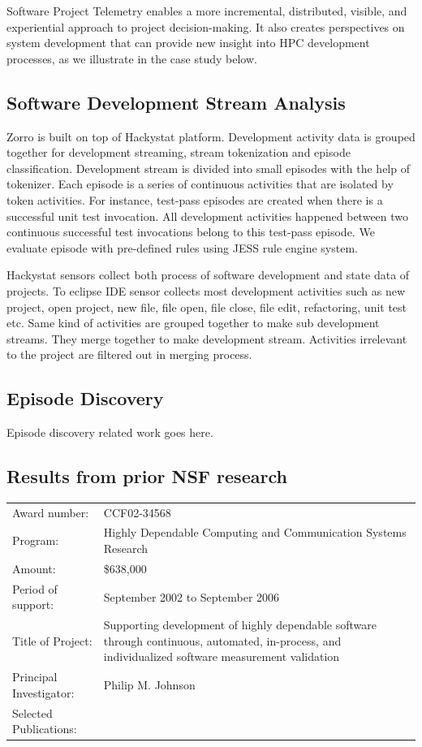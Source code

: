 Software Project Telemetry enables a more incremental, distributed,
visible, and experiential approach to project decision-making. It also
creates perspectives on system development that can provide new insight
into HPC development processes, as we illustrate in the case study below.


\subsection{Software Development Stream Analysis}

Zorro is built on top of Hackystat platform. Development activity data is
grouped together for development streaming, stream tokenization and episode
classification. Development stream is divided into small episodes with the
help of tokenizer. Each episode is a series of continuous activities that
are isolated by token activities. For instance, test-pass episodes are
created when there is a successful unit test invocation. All development
activities happened between two continuous successful test invocations
belong to this test-pass episode. We evaluate episode with pre-defined
rules using JESS \cite{Friedman-Hill:03} rule engine system.


Hackystat sensors collect both process of software development and state
data of projects. To eclipse IDE sensor collects most development
activities such as new project, open project, new file, file open, file
close, file edit, refactoring, unit test etc. Same kind of activities
are grouped together to make sub development streams. They merge together to
make development stream. Activities
irrelevant to the project are filtered out in merging process.

\subsection{Episode Discovery}

Episode discovery related work goes here. 


\subsection{Results from prior NSF research}

\small
\begin{tabular}{lp{4.5in}}

Award number: & CCF02-34568 \\
Program: & Highly Dependable Computing and Communication Systems Research\\
Amount: & \$638,000 \\
Period of support: & September 2002 to September 2006 \\
Title of Project: & Supporting development of highly dependable software through
continuous, automated, in-process, and individualized software measurement validation \\
Principal Investigator: & Philip M. Johnson \\
Selected Publications: & \cite{csdl2-04-22,csdl2-04-13,csdl2-04-11,csdl2-03-12,csdl2-02-07,csdl2-03-07,csdl2-04-02,csdl2-04-04,csdl2-04-06}
\end{tabular} \\ %
\normalsize

